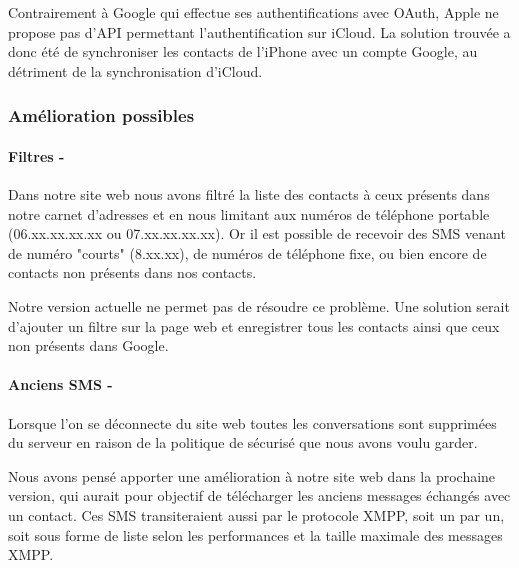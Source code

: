 Contrairement à Google qui effectue ses authentifications avec OAuth, Apple ne propose pas d'API permettant l'authentification sur iCloud.
La solution trouvée a donc été de synchroniser les contacts de l'iPhone avec un compte Google, au détriment de la synchronisation d'iCloud.


\subsubsection{Amélioration possibles}

\paragraph{Filtres -}
Dans notre site web nous avons filtré la liste des contacts à ceux présents dans notre carnet d'adresses et en nous limitant aux numéros de téléphone portable (06.xx.xx.xx.xx ou 07.xx.xx.xx.xx).
Or il est possible de recevoir des SMS venant de numéro "courts" (8.xx.xx), de numéros de téléphone fixe, ou bien encore de contacts non présents dans nos contacts.

Notre version actuelle ne permet pas de résoudre ce problème.
Une solution serait d'ajouter un filtre sur la page web et enregistrer tous les contacts ainsi que ceux non présents dans Google.
\\


\paragraph{Anciens SMS -}
Lorsque l'on se déconnecte du site web toutes les conversations sont supprimées du serveur en raison de la politique de sécurisé que nous avons voulu garder.

Nous avons pensé apporter une amélioration à notre site web dans la prochaine version, qui aurait pour objectif de télécharger les anciens messages échangés avec un contact.
Ces SMS transiteraient aussi par le protocole XMPP, soit un par un, soit sous forme de liste selon les performances et la taille maximale des messages XMPP.
\\





